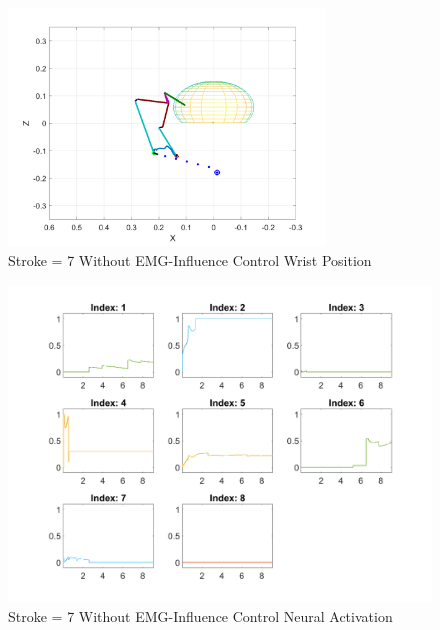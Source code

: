 \begin{figure}[h!]
\centering
\includegraphics[width=0.75\textwidth]{Pictures/Results/Controller/StrokeWithouControl_WP.png} 
\caption{Stroke = 7 Without EMG-Influence Control Wrist Position} %
\label{fig:WOEMGWP} %
\end{figure}

\begin{figure}[h!]
\centering
\includegraphics[width=1\textwidth]{Pictures/Results/Controller/StrokeWithouControl_NA.png} 
\caption{Stroke = 7 Without EMG-Influence Control Neural Activation} %
\label{fig:WOEMGNA} %
\end{figure}


